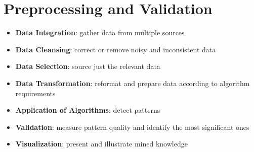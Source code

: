 
\section{Preprocessing and Validation}

\begin{breakbox}

\begin{itemize}
	\item \textbf{Data Integration}: gather data from multiple sources
	\item \textbf{Data Cleansing}: correct or remove noisy and inconsistent data
	\item \textbf{Data Selection}: source just the relevant data
	\item \textbf{Data Transformation}: reformat and prepare data according to algorithm requirements
	\item \textbf{Application of Algorithms}: detect patterns
	\item \textbf{Validation}: measure pattern quality and identify the most significant ones
	\item \textbf{Visualization}: present and illustrate mined knowledge
\end{itemize}
\end{breakbox}



